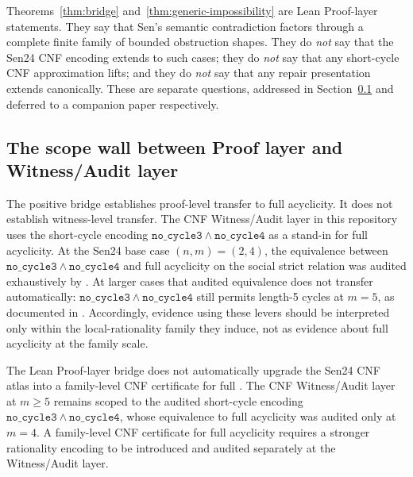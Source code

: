 \begin{remark}
\label{rem:lift-scope}
Theorems~\ref{thm:bridge} and~\ref{thm:generic-impossibility} are Lean Proof-layer statements.
They say that Sen's semantic contradiction factors through a complete finite family of bounded obstruction shapes.
They do \emph{not} say that the Sen24 CNF encoding extends to such cases; they do \emph{not} say that any short-cycle CNF approximation lifts; and they do \emph{not} say that any repair presentation extends canonically.
These are separate questions, addressed in Section~\ref{sec:negative} and deferred to a companion paper respectively.
\end{remark}

\subsection{The scope wall between Proof layer and Witness/Audit layer}
\label{sec:negative}

The positive bridge establishes proof-level transfer to full acyclicity.
It does not establish witness-level transfer.
The CNF Witness/Audit layer in this repository uses the short-cycle encoding \(\mathtt{no\_cycle3} \wedge \mathtt{no\_cycle4}\) as a stand-in for full acyclicity.
At the Sen24 base case \((n,m)=(2,4)\), the equivalence between \(\mathtt{no\_cycle3} \wedge \mathtt{no\_cycle4}\) and full acyclicity on the social strict relation was audited exhaustively by .
At larger cases that audited equivalence does not transfer automatically: \(\mathtt{no\_cycle3} \wedge \mathtt{no\_cycle4}\) still permits length-5 cycles at \(m = 5\), as documented in .
Accordingly, evidence using these levers should be interpreted only within the local-rationality family they induce, not as evidence about full acyclicity at the family scale.

\begin{proposition}
\label{prop:scope-wall}
The Lean Proof-layer bridge does not automatically upgrade the Sen24 CNF atlas into a family-level CNF certificate for full .
The CNF Witness/Audit layer at \(m \geq 5\) remains scoped to the audited short-cycle encoding \(\mathtt{no\_cycle3} \wedge \mathtt{no\_cycle4}\), whose equivalence to full acyclicity was audited only at \(m = 4\).
A family-level CNF certificate for full acyclicity requires a stronger rationality encoding to be introduced and audited separately at the Witness/Audit layer.
\end{proposition}

